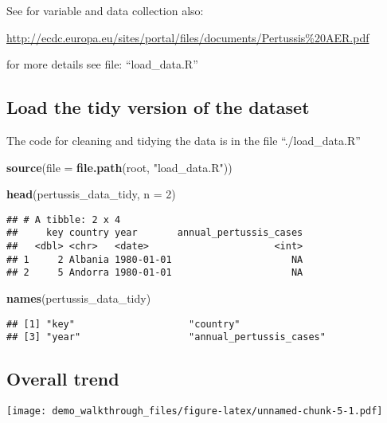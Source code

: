 \documentclass[]{article}
\newenvironment{Shaded}{\begin{snugshade}}{\end{snugshade}}
\newcommand{\KeywordTok}[1]{\textcolor[rgb]{0.13,0.29,0.53}{\textbf{#1}}}
\newcommand{\DataTypeTok}[1]{\textcolor[rgb]{0.13,0.29,0.53}{#1}}
\newcommand{\DecValTok}[1]{\textcolor[rgb]{0.00,0.00,0.81}{#1}}
\newcommand{\StringTok}[1]{\textcolor[rgb]{0.31,0.60,0.02}{#1}}
\newcommand{\NormalTok}[1]{#1}
\begin{document}
See for variable and data collection also:

\url{http://ecdc.europa.eu/sites/portal/files/documents/Pertussis\%20AER.pdf}

for more details see file: ``load\_data.R''

\subsection{Load the tidy version of the
dataset}\label{load-the-tidy-version-of-the-dataset}

The code for cleaning and tidying the data is in the file
``./load\_data.R''

\begin{Shaded}
\begin{Highlighting}[]
\KeywordTok{source}\NormalTok{(}\DataTypeTok{file =} \KeywordTok{file.path}\NormalTok{(root,}
                        \StringTok{"load_data.R"}\NormalTok{))}
  
\KeywordTok{head}\NormalTok{(pertussis_data_tidy, }\DataTypeTok{n =} \DecValTok{2}\NormalTok{)}
\end{Highlighting}
\end{Shaded}

\begin{verbatim}
## # A tibble: 2 x 4
##     key country year       annual_pertussis_cases
##   <dbl> <chr>   <date>                      <int>
## 1     2 Albania 1980-01-01                     NA
## 2     5 Andorra 1980-01-01                     NA
\end{verbatim}

\begin{Shaded}
\begin{Highlighting}[]
\KeywordTok{names}\NormalTok{(pertussis_data_tidy)}
\end{Highlighting}
\end{Shaded}

\begin{verbatim}
## [1] "key"                    "country"               
## [3] "year"                   "annual_pertussis_cases"
\end{verbatim}

\subsection{Overall trend}\label{overall-trend}

\texttt{[image: demo\_walkthrough\_files/figure-latex/unnamed-chunk-5-1.pdf]}
\end{document}
